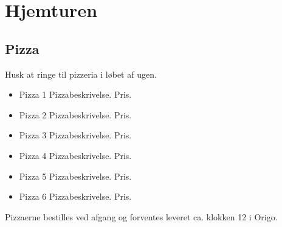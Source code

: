 \section{Hjemturen}

\subsection{Pizza}

Husk at ringe til pizzeria i løbet af ugen.


\begin{itemize}
\item{Pizza 1} Pizzabeskrivelse. Pris.
\item{Pizza 2} Pizzabeskrivelse. Pris.
\item{Pizza 3} Pizzabeskrivelse. Pris.
\item{Pizza 4} Pizzabeskrivelse. Pris.
\item{Pizza 5} Pizzabeskrivelse. Pris.
\item{Pizza 6} Pizzabeskrivelse. Pris.
\end{itemize}

Pizzaerne bestilles ved afgang og forventes leveret ca. klokken 12 i Origo.
\newpage


